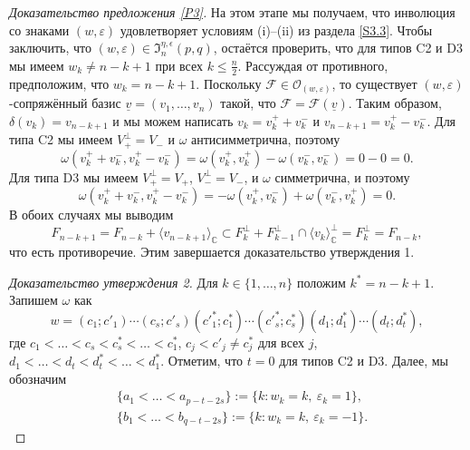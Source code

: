 \documentclass{amsart}
\theoremstyle{definition}
\begin{document}
\begin{proof}[Доказательство предложения \ref{P3}]
На этом этапе мы получаем, что инволюция со знаками $(w,\varepsilon)$ удовлетворяет условиям {\rm (i)}--{\rm (ii)} из раздела \ref{S3.3}.
Чтобы заключить, что $(w,\varepsilon)\in\mathfrak{I}_n^{\eta,\epsilon}(p,q)$, остаётся проверить, что для типов C2 и D3 мы имеем $w_k\not=n-k+1$ при всех $k\leq\frac{n}{2}$. Рассуждая от противного, предположим, что $w_k=n-k+1$. Поскольку $\mathcal{F}\in\mathcal{O}_{(w,\varepsilon)}$, то существует $(w,\varepsilon)$-сопряжённый базис $\underline{v}=(v_1,\ldots,v_n)$ такой, что $\mathcal{F}=\mathcal{F}(\underline{v})$.
Таким образом, $\delta(v_k)=v_{n-k+1}$ и мы можем написать $v_k=v_k^++v_k^-$ и $v_{n-k+1}=v_k^+-v_k^-$.
Для типа C2 мы имеем $V_+^\perp=V_-$ и $\omega$ антисимметрична, поэтому
\[\omega(v_k^++v_k^-,v_k^+-v_k^-)=\omega(v_k^+,v_k^+)-\omega(v_k^-,v_k^-)=0-0=0.\]
Для типа D3 мы имеем $V_+^\perp=V_+$, $V_-^\perp=V_-$, и $\omega$ симметрична, и поэтому
\[\omega(v_k^++v_k^-,v_k^+-v_k^-)=-\omega(v_k^+,v_k^-)+\omega(v_k^-,v_k^+)=0.\]
В обоих случаях мы выводим
\[F_{n-k+1}=F_{n-k}+\langle v_{n-k+1}\rangle_{\mathbb{C}}\subset F_k^\perp+F_{k-1}^\perp\cap\langle v_k\rangle_\mathbb{C}^\perp=F_k^\perp=F_{n-k},\]
что есть противоречие.
Этим завершается доказательство утверждения 1.

\medskip
\noindent
{\it Доказательство утверждения 2.}
Для $k\in\{1,\ldots,n\}$ положим $k^*=n-k+1$. Запишем $\omega$ как
\[w=(c_1;c'_1)\cdots(c_s;c'_s)(c'^*_1;c^*_1)\cdots(c'^*_s;c^*_s)(d_1;d^*_1)\cdots(d_t;d^*_t),\]
где $c_1<\ldots<c_s<c^*_s<\ldots<c^*_1$, $c_j<c'_j\not=c^*_j$ для всех $j$, $d_1<\ldots<d_t<d^*_t<\ldots<d^*_1$. Отметим, что $t=0$ для типов C2 и D3.
Далее, мы обозначим
\begin{eqnarray*}
 & \{a_1<\ldots<a_{p-t-2s}\}:=\{k:w_k=k,\ \varepsilon_k=1\},\\
 & \{b_1<\ldots<b_{q-t-2s}\}:=\{k:w_k=k,\ \varepsilon_k=-1\}.
\end{eqnarray*}


\end{proof}
\end{document}
